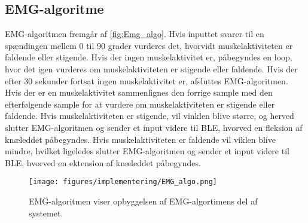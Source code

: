 \subsection{EMG-algoritme}
EMG-algoritmen fremgår af \autoref{fig:Emg_algo}. Hvis inputtet svarer til en spændingen mellem 0 til 90 grader vurderes det, hvorvidt muskelaktiviteten er faldende eller stigende. Hvis der ingen muskelaktivitet er, påbegyndes en loop, hvor det igen vurderes om muskelaktiviteten er stigende eller faldende. Hvis der efter 30 sekunder fortsat ingen muskelaktivitet er, afsluttes EMG-algoritmen. Hvis der er en muskelaktivitet sammenlignes den forrige sample med den efterfølgende sample for at vurdere om muskelaktiviteten er stigende eller faldende. Hvis muskelaktiviteten er stigende, vil vinklen blive større, og herved slutter EMG-algoritmen og sender et input videre til BLE, hvorved en fleksion af knæleddet påbegyndes. Hvis muskelaktiviteten er faldende vil viklen blive mindre, hvilket ligeledes slutter EMG-algoritmen og sender et input videre til BLE, hvorved en ektension af knæleddet påbegyndes. 
\begin{figure}[H]
\centering
\texttt{[image: figures/implementering/EMG\_algo.png]}
\caption{EMG-algoritmen viser opbyggelsen af EMG-algortimens del af systemet.}
\label{fig:Emg_algo}
\end{figure}

